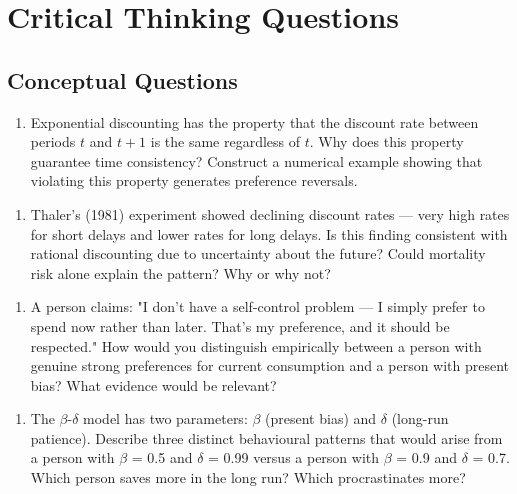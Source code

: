 \documentclass[12pt, letterpaper]{article}
\begin{document}
\section*{Critical Thinking Questions}



\subsection{Conceptual Questions}


\begin{enumerate}
\item Exponential discounting has the property that the discount rate between periods $t$ and $t+1$ is the same regardless of $t$. Why does this property guarantee time consistency? Construct a numerical example showing that violating this property generates preference reversals.
\end{enumerate}

\begin{enumerate}
\item Thaler's (1981) experiment showed declining discount rates --- very high rates for short delays and lower rates for long delays. Is this finding consistent with rational discounting due to uncertainty about the future? Could mortality risk alone explain the pattern? Why or why not?
\end{enumerate}

\begin{enumerate}
\item A person claims: "I don't have a self-control problem --- I simply prefer to spend now rather than later. That's my preference, and it should be respected." How would you distinguish empirically between a person with genuine strong preferences for current consumption and a person with present bias? What evidence would be relevant?
\end{enumerate}

\begin{enumerate}
\item The $\beta$-$\delta$ model has two parameters: $\beta$ (present bias) and $\delta$ (long-run patience). Describe three distinct behavioural patterns that would arise from a person with $\beta$ = 0.5 and $\delta$ = 0.99 versus a person with $\beta$ = 0.9 and $\delta$ = 0.7. Which person saves more in the long run? Which procrastinates more?
\end{enumerate}
\end{document}

